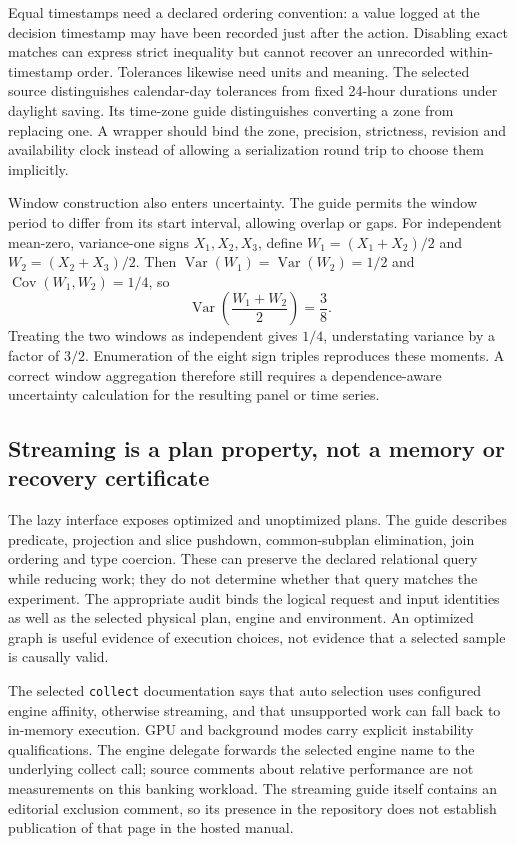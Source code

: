 Equal timestamps need a declared ordering convention: a value logged at
the decision timestamp may have been recorded just after the action.
Disabling exact matches can express strict inequality but cannot recover
an unrecorded within-timestamp order. Tolerances likewise need units and
meaning. The selected source distinguishes calendar-day tolerances from
fixed 24-hour durations under daylight saving. Its time-zone guide
distinguishes converting a zone from replacing one. A wrapper should bind
the zone, precision, strictness, revision and availability clock instead
of allowing a serialization round trip to choose them implicitly.
\citep{exec23_polars_sources}

Window construction also enters uncertainty. The guide permits the
window period to differ from its start interval, allowing overlap or
gaps. For independent mean-zero, variance-one signs $X_1,X_2,X_3$, define
$W_1=(X_1+X_2)/2$ and $W_2=(X_2+X_3)/2$. Then
$\operatorname{Var}(W_1)=\operatorname{Var}(W_2)=1/2$ and
$\operatorname{Cov}(W_1,W_2)=1/4$, so
\begin{equation}
 \operatorname{Var}\!\left(\frac{W_1+W_2}{2}\right)=\frac{3}{8}.
 \label{eq:exec23-polars-overlap}
\end{equation}
Treating the two windows as independent gives $1/4$, understating variance
by a factor of $3/2$. Enumeration of the eight sign triples reproduces
these moments. A correct window aggregation therefore still requires a
dependence-aware uncertainty calculation for the resulting panel or time
series.~\citep{exec23_polars_sources,exec23_polars_reference}

\subsection{Streaming is a plan property, not a memory or recovery certificate}

The lazy interface exposes optimized and unoptimized plans. The guide
describes predicate, projection and slice pushdown, common-subplan
elimination, join ordering and type coercion. These can preserve the
declared relational query while reducing work; they do not determine
whether that query matches the experiment. The appropriate audit binds
the logical request and input identities as well as the selected physical
plan, engine and environment. An optimized graph is useful evidence of
execution choices, not evidence that a selected sample is causally valid.
\citep{exec23_polars_sources}

The selected \texttt{collect} documentation says that auto selection uses
configured engine affinity, otherwise streaming, and that unsupported
work can fall back to in-memory execution. GPU and background modes carry
explicit instability qualifications. The engine delegate forwards the
selected engine name to the underlying collect call; source comments
about relative performance are not measurements on this banking workload.
The streaming guide itself contains an editorial exclusion comment, so
its presence in the repository does not establish publication of that
page in the hosted manual.~\citep{exec23_polars_sources}

